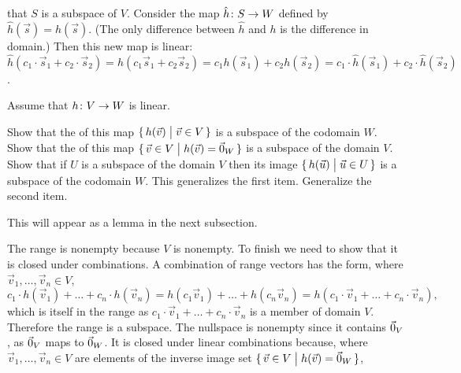 \begin{exercises}
\begin{answer}
      that \( S \) is a subspace of \( V \).
      Consider the map \( \mbox{$\hat{h}\colon S\to W$} \) defined by
      \( \hat{h}(\vec{s})=h(\vec{s}) \).
      (The only difference between $\hat{h}$ and $h$ is the difference in  
      domain.)
      Then this new map is linear: 
      \( \hat{h}(c_1\cdot\vec{s}_1+c_2\cdot\vec{s}_2)=
              h(c_1\vec{s}_1+c_2\vec{s}_2)=c_1h(\vec{s}_1)+c_2h(\vec{s}_2)=
              c_1\cdot\hat{h}(\vec{s}_1)+c_2\cdot\hat{h}(\vec{s}_2) \).  
    \end{answer}
  \item 
    Assume that \( \mbox{$h\colon V\to W$} \) is linear.
    \begin{exparts}
      \partsitem Show that the  of this map 
        \( \mbox{$\{\,h(\vec{v})\bigm| \vec{v}\in V\,\}$} \) is a subspace of 
        the codomain \( W \).
      \partsitem Show that the  of this map
        \( \mbox{$\{\,\vec{v}\in V\bigm| h(\vec{v})=\vec{0}_W\,\}$} \) 
        is a subspace of the domain \( V \).
      \partsitem Show that if \( U \) is a subspace of the domain \( V \) then
        its image \( \mbox{$\{\,h(\vec{u})\bigm| \vec{u}\in U\,\}$} \) is a subspace 
        of the codomain \( W \).
        This generalizes the first item.
      \partsitem Generalize the second item.
    \end{exparts}
    \begin{answer} This will appear as a lemma in the next subsection.
      \begin{exparts}
        \partsitem The range is nonempty because \( V \) is nonempty.
          To finish we need to show that it is closed under combinations.
          A combination of range vectors has the form,
          where \( \vec{v}_1,\dots,\vec{v}_n\in V \),
          \begin{equation*}
            c_1\cdot h(\vec{v}_1)+\dots+c_n\cdot h(\vec{v}_n)
            =
            h(c_1\vec{v}_1)+\dots+h(c_n\vec{v}_n)
            =
            h(c_1\cdot \vec{v}_1+\dots+c_n\cdot \vec{v}_n),
          \end{equation*}
          which is itself in the range as
          \( c_1\cdot \vec{v}_1+\dots+c_n\cdot \vec{v}_n \) is a member of
          domain \( V \).
          Therefore the range is a subspace.
        \partsitem The nullspace is nonempty since it contains $\vec{0}_V$, as
          \( \vec{0}_V \) maps to \( \vec{0}_W \).
          It is closed under linear combinations because, where
          \( \vec{v}_1,\dots,\vec{v}_n\in V \) are elements 
          of the inverse image set
          \( \mbox{$\{\,\vec{v}\in V\bigm| h(\vec{v})=\vec{0}_W\,\}$} \),

\end{exparts}
\end{answer}
\end{exercises}

